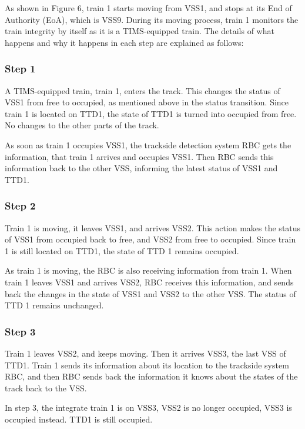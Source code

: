 \documentclass[article,dr=phil,type=msc,colorback,accentcolor=tud9c]{tudthesis}
\begin{document}
  As shown in Figure 6, train 1 starts moving from VSS1, and stops at its End of Authority (EoA), which is VSS9. During its moving process, train 1 monitors the train integrity by itself as it is a TIMS-equipped train. The details of what happens and why it happens in each step are explained as follows:
  	
  	\subsubsection{Step 1}
  	
  	A TIMS-equipped train, train 1, enters the track. This changes the status of VSS1 from free to occupied, as mentioned above in the status transition. Since train 1 is located on TTD1, the state of TTD1 is turned into occupied from free. No changes to the other parts of the track.
  	
  	As soon as train 1 occupies VSS1, the trackside detection system RBC gets the information, that train 1 arrives and occupies VSS1. Then RBC sends this information back to the other VSS, informing the latest status of VSS1 and TTD1.
  	
    \subsubsection{Step 2}
  	
  	Train 1 is moving, it leaves VSS1, and arrives VSS2. This action makes the status of VSS1 from occupied back to free, and VSS2 from free to occupied. Since train 1 is still located on TTD1, the state of TTD 1 remains occupied.
  	
  	As train 1 is moving, the RBC is also receiving information from train 1. When train 1 leaves VSS1 and arrives VSS2, RBC receives this information, and sends back the changes in the state of VSS1 and VSS2 to the other VSS. The status of TTD 1 remains unchanged. 	
  	
  	\subsubsection{Step 3}
  	
  	Train 1 leaves VSS2, and keeps moving. Then it arrives VSS3, the last VSS of TTD1. Train 1 sends its information about its location to the trackside system RBC, and then RBC sends back the information it knows about the states of the track back to the VSS.
  	
  	In step 3, the integrate train 1 is on VSS3, VSS2 is no longer occupied, VSS3 is occupied instead. TTD1 is still occupied.
  	
\end{document}
